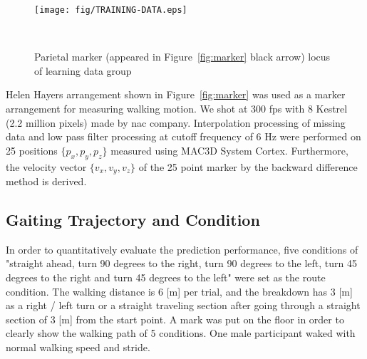 \documentclass{sigchi}
\begin{document}
\begin{figure*}
\centering
  \texttt{[image: fig/TRAINING-DATA.eps]}
  \caption{Parietal marker (appeared in Figure~\ref{fig:marker} black arrow) locus of learning data group}~ 
    \label{fig:training-data}
\end{figure*}


Helen Hayers arrangement shown in Figure~\ref{fig:marker} was used as a marker arrangement for measuring walking motion. We shot at 300 fps with 8 Kestrel (2.2 million pixels) made by nac company. Interpolation processing of missing data and low pass filter processing at cutoff frequency of 6 Hz were performed on 25 positions $\{p_x, p_y, p_z \}$ measured using MAC3D System Cortex. Furthermore, the velocity vector $ \{v_x, v_y, v_z \} $ of the 25 point marker by the backward difference method is derived.



\subsection{Gaiting Trajectory and Condition}

In order to quantitatively evaluate the prediction performance, five conditions of "straight ahead, turn 90 degrees to the right, turn 90 degrees to the left, turn 45 degrees to the right and turn 45 degrees to the left" were set as the route condition. The walking distance is 6 [m] per trial, and the breakdown has 3 [m] as a right / left turn or a straight traveling section after going through a straight section of 3 [m] from the start point. A mark was put on the floor  in order to clearly show the walking path of 5 conditions. One male participant waked with normal walking speed and stride.
\end{document}
